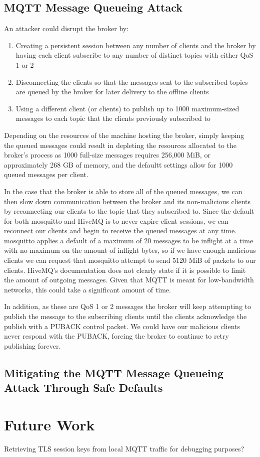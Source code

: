 \documentclass[12pt]{article}
\begin{document}
\subsection{MQTT Message Queueing Attack}
An attacker could disrupt the broker by:
\begin{enumerate}
	\item Creating a persistent session between any number of clients and the broker by having each client subscribe to any number of distinct topics with either QoS 1 or 2
	\item Disconnecting the clients so that the messages sent to the subscribed topics are queued by the broker for later delivery to the offline clients
	\item Using a different client (or clients) to publish up to 1000 maximum-sized messages to each topic that the clients previously subscribed to
\end{enumerate}
Depending on the resources of the machine hosting the broker, simply keeping the queued messages could result in depleting the resources allocated to the broker's process as 1000 full-size messages requires 256,000 MiB, or approximately 268 GB of memory, and the defaultt settings allow for 1000 queued messages per client.\par
In the case that the broker is able to store all of the queued messages, we can then slow down communication between the broker and its non-malicious clients by reconnecting our clients to the topic that they subscribed to. Since the default for both mosquitto and HiveMQ is to never expire client sessions, we can reconnect our clients and begin to receive the queued messages at any time. mosquitto applies a default of a maximum of 20 messages to be inflight at a time with no maximum on the amount of inflight bytes, so if we have enough malicious clients we can request that mosquitto attempt to send 5120 MiB of packets to our clients. HiveMQ's documentation does not clearly state if it is possible to limit the amount of outgoing messages\cite{hivemq-bw}. Given that MQTT is meant for low-bandwidth networks, this could take a significant amount of time.\par
In addition, as these are QoS 1 or 2 messages the broker will keep attempting to publish the message to the subscribing clients until the clients acknowledge the publish with a PUBACK control packet. We could have our malicious clients never respond with the PUBACK, forcing the broker to continue to retry publishing forever. 
\subsection{Mitigating the MQTT Message Queueing Attack Through Safe Defaults}

\section{Future Work}
Retrieving TLS session keys from local MQTT traffic for debugging purposes?



\end{document}
